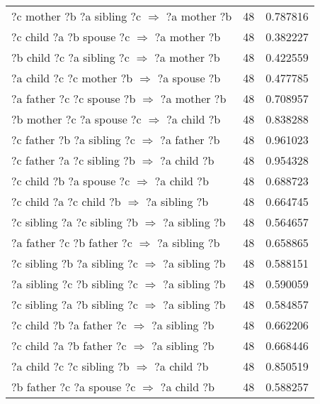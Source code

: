 \begin{longtable}{lrr}
     ?c  mother  ?b  ?a  sibling  ?c   $\Rightarrow$ ?a  mother  ?b &           48 &        0.787816 \\
       ?c  child  ?a  ?b  spouse  ?c   $\Rightarrow$ ?a  mother  ?b &           48 &        0.382227 \\
      ?b  child  ?c  ?a  sibling  ?c   $\Rightarrow$ ?a  mother  ?b &           48 &        0.422559 \\
       ?a  child  ?c  ?c  mother  ?b   $\Rightarrow$ ?a  spouse  ?b &           48 &        0.477785 \\
      ?a  father  ?c  ?c  spouse  ?b   $\Rightarrow$ ?a  mother  ?b &           48 &        0.708957 \\
       ?b  mother  ?c  ?a  spouse  ?c   $\Rightarrow$ ?a  child  ?b &           48 &        0.838288 \\
     ?c  father  ?b  ?a  sibling  ?c   $\Rightarrow$ ?a  father  ?b &           48 &        0.961023 \\
      ?c  father  ?a  ?c  sibling  ?b   $\Rightarrow$ ?a  child  ?b &           48 &        0.954328 \\
        ?c  child  ?b  ?a  spouse  ?c   $\Rightarrow$ ?a  child  ?b &           48 &        0.688723 \\
       ?c  child  ?a  ?c  child  ?b   $\Rightarrow$ ?a  sibling  ?b &           48 &        0.664745 \\
   ?c  sibling  ?a  ?c  sibling  ?b   $\Rightarrow$ ?a  sibling  ?b &           48 &        0.564657 \\
     ?a  father  ?c  ?b  father  ?c   $\Rightarrow$ ?a  sibling  ?b &           48 &        0.658865 \\
   ?c  sibling  ?b  ?a  sibling  ?c   $\Rightarrow$ ?a  sibling  ?b &           48 &        0.588151 \\
   ?a  sibling  ?c  ?b  sibling  ?c   $\Rightarrow$ ?a  sibling  ?b &           48 &        0.590059 \\
   ?c  sibling  ?a  ?b  sibling  ?c   $\Rightarrow$ ?a  sibling  ?b &           48 &        0.584857 \\
      ?c  child  ?b  ?a  father  ?c   $\Rightarrow$ ?a  sibling  ?b &           48 &        0.662206 \\
      ?c  child  ?a  ?b  father  ?c   $\Rightarrow$ ?a  sibling  ?b &           48 &        0.668446 \\
       ?a  child  ?c  ?c  sibling  ?b   $\Rightarrow$ ?a  child  ?b &           48 &        0.850519 \\
       ?b  father  ?c  ?a  spouse  ?c   $\Rightarrow$ ?a  child  ?b &           48 &        0.588257 \\

\end{longtable}
